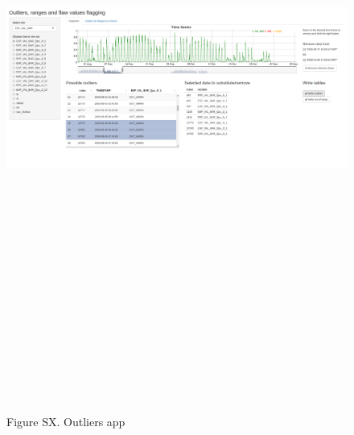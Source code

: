 \documentclass[]{article}
\begin{document}
\begin{figure}

{\centering \includegraphics[width=26.67in,height=800px]{resources/out_app} 

}

\caption{Figure SX. Outliers app}\label{fig:fig_outliers_app}
\end{figure}

\pagebreak

\pagebreak

\pagebreak

\pagebreak
\end{document}
